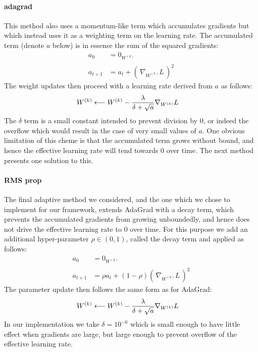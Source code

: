 \documentclass[msc]{infthesis}
\newcommand{\weights}[2][]{W_{#1}^{(#2)}}
\newcommand{\of}[1]{\left(\,{#1}\,\right)}
\begin{document}
\paragraph*{adagrad}
%
This method also uses a momentum-like term which accumulates gradients but which instead uses it
as a weighting term on the learning rate.  The accumulated term (denote \(a\) below) is in
essense the sum of the squared gradients:
\begin{align}
  \label{eq:adagrad}
  a_{0}
  &=
    0_{\weights{k}}
  \\
  a_{t+1}
  &=
    a_{t} + \of{ \nabla_{\weights{k}} L }^2
\end{align}
The weight updates then proceed with a learning rate derived from \(a\) as follows:
\begin{align}
  \weights{k}
  &\longleftarrow
    \weights{k}
    -
    { \lambda \over \delta + \sqrt{a} } \nabla_{\weights{k}} L
\end{align}
%
The \(\delta\) term is a small constant intended to prevent division by 0, or indeed
the overflow which would result in the case of very small values of \(a\).
%
One obvious
limitation of this cheme is that the accumulated term grows without bound, and hence the effective
learning rate will tend towards \(0\) over time.  The next method presents one solution to this.
\cite{goodfellow2016deep}


\paragraph*{RMS prop}
%
The final adaptive method we considered, and the one which we chose to implement for our
framework, extends AdaGrad with a decay term, which prevents the accumulated gradients from
growing unboundedly, and hence does not drive the effective learning rate to 0 over time.  For
this purpose we add an additional hyper-parameter \(\rho \in (0, 1)\), called the decay term
and applied as follows:
\begin{align}
  \label{eq:adagrad}
  a_{0}
  &=
    0_{\weights{k}}
  \\
  a_{t+1}
  &=
    \rho a_{t} + (1 - \rho)\of{ \nabla_{\weights{k}} L }^2
\end{align}
The parameter update then follows the same form as for AdaGrad:
%
\begin{align}
  \weights{k}
  &\longleftarrow
    \weights{k}
    -
    { \lambda \over \delta + \sqrt{a} } \nabla_{\weights{k}} L
\end{align}
%
In our implementation we take \(\delta = 10^{-6}\) which is small enough to have little effect
when gradients are large, but large enough to prevent overflow of the effective learning rate.
\cite{goodfellow2016deep}
\end{document}
